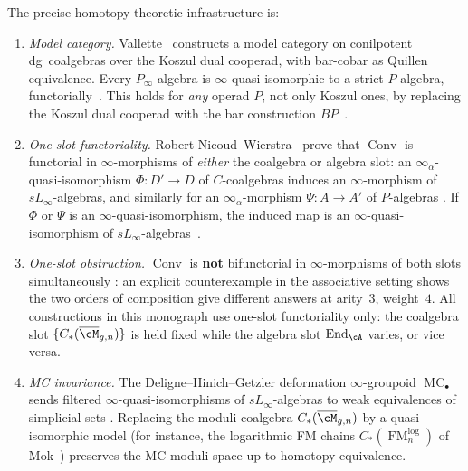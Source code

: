 \begin{remark}
The precise homotopy-theoretic infrastructure is:
\begin{enumerate}[label=\textup{(\alph*)}]
\item \emph{Model category.}
  Vallette~\cite[Theorem~2.1]{Val16} constructs a model category on
  conilpotent dg~coalgebras over the Koszul dual cooperad,
  with bar-cobar as Quillen equivalence.  Every
  $P_\infty$-algebra is $\infty$-quasi-isomorphic to a strict
  $P$-algebra, functorially~\cite[Theorem~1.2]{Val16}.
  This holds for \emph{any} operad $P$, not only Koszul ones, by
  replacing the Koszul dual cooperad with the bar
  construction $BP$~\cite[\S1.6]{Val16}.
\item \emph{One-slot functoriality.}
  Robert-Nicoud--Wierstra~\cite[Theorem~5.1]{RNW19} prove that
  $\operatorname{Conv}$ is functorial in $\infty$-morphisms of
  \emph{either} the coalgebra or algebra slot:
  an $\infty_\alpha$-quasi-isomorphism $\Phi\colon D' \to D$
  of $C$-coalgebras induces an $\infty$-morphism of
  $sL_\infty$-algebras, and similarly for an
  $\infty_\alpha$-morphism $\Psi\colon A \to A'$ of $P$-algebras
  \cite[Corollary~5.4]{RNW19}.
  If $\Phi$ or $\Psi$ is an $\infty$-quasi-isomorphism, the
  induced map is an $\infty$-quasi-isomorphism of
  $sL_\infty$-algebras~\cite[Proposition~5.5]{RNW19}.
\item \emph{One-slot obstruction.}
  $\operatorname{Conv}$ is \textbf{not} bifunctorial in
  $\infty$-morphisms of both slots simultaneously
  \cite[Theorem~6.6]{RNW19}: an explicit counterexample
  in the associative setting shows the two orders of composition
  give different answers at arity~$3$, weight~$4$.
  All constructions in this monograph use one-slot functoriality
  only: the coalgebra slot $\{C_*(\overline{\cM}_{g,n})\}$ is held
  fixed while the algebra slot $\operatorname{End}_{\cA}$ varies,
  or vice versa.
\item \emph{MC invariance.}
  The Deligne--Hinich--Getzler deformation $\infty$-groupoid
  $\operatorname{MC}_\bullet$ sends filtered
  $\infty$-quasi-isomorphisms of $sL_\infty$-algebras
  to weak equivalences of simplicial sets
  \cite[Theorem~8.10]{RNW19}.  Replacing the moduli
  coalgebra $C_*(\overline{\cM}_{g,n})$ by a quasi-isomorphic
  model (for instance, the logarithmic FM chains
  $C_*(\operatorname{FM}^{\mathrm{log}}_n)$
  of Mok~\cite{Mok25}) preserves the MC moduli space up to
  homotopy equivalence.
\end{enumerate}
\end{remark}

